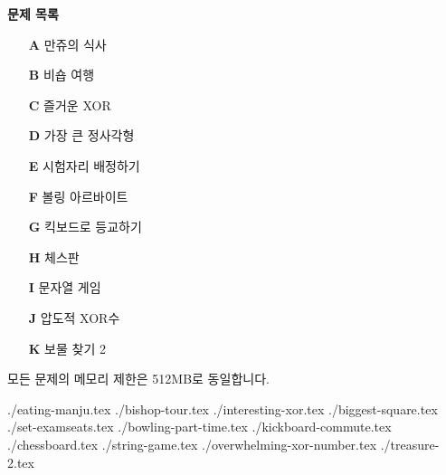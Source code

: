 \documentclass[10pt,a4paper,oneside,dvipsnames]{article}
\newcommand{\importproblem}[1]{{./#1.tex}}
\begin{document}
\BuildContestTitle


\begin{center}
    \textbf{\Large\textsf{문제 목록}}
\end{center}


\begin{center}
    \begin{minipage}{0.35\textwidth}
        \begin{itemize}
            
	\item[\textbf{A}] 만쥬의 식사
	\item[\textbf{B}] 비숍 여행
	\item[\textbf{C}] 즐거운 XOR
	\item[\textbf{D}] 가장 큰 정사각형
	\item[\textbf{E}] 시험자리 배정하기
	\item[\textbf{F}] 볼링 아르바이트
	\item[\textbf{G}] 킥보드로 등교하기
	\item[\textbf{H}] 체스판
	\item[\textbf{I}] 문자열 게임
	\item[\textbf{J}] 압도적 XOR수
	\item[\textbf{K}] 보물 찾기 2


        \end{itemize}    
    \end{minipage}
\end{center}

모든 문제의 메모리 제한은 512MB로 동일합니다.
\newpage

\importproblem{eating-manju} %
\importproblem{bishop-tour} %
\importproblem{interesting-xor} %
\importproblem{biggest-square} %
\importproblem{set-examseats} %
\importproblem{bowling-part-time} %
\importproblem{kickboard-commute} %
\importproblem{chessboard} %
\importproblem{string-game} %
\importproblem{overwhelming-xor-number} %
\importproblem{treasure-2} %
\end{document}
